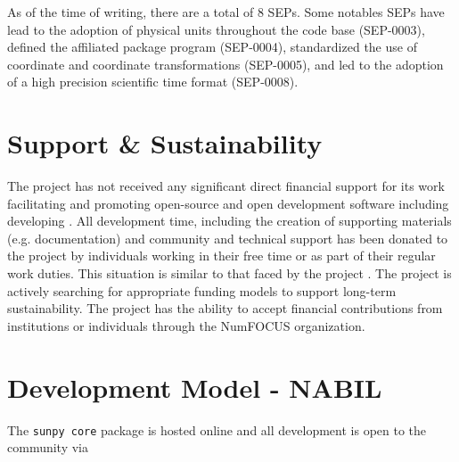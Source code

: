 As of the time of writing, there are a total of 8 SEPs. Some notables SEPs have lead to the adoption of physical units throughout the code base (SEP-0003), defined the affiliated package program (SEP-0004), standardized the use of coordinate and coordinate transformations (SEP-0005), and led to the adoption of a high precision scientific time format (SEP-0008).

\section{Support \& Sustainability}
The \sunpy project has not received any significant direct financial support for its work facilitating and promoting open-source and open development software including developing \sunpypkg. All development time, including the creation of supporting materials (e.g. documentation) and community and technical support has been donated to the project by individuals working in their free time or as part of their regular work duties. This situation is similar to that faced by the \astropy project \citep{PriceWhelan:2018ji}. The \sunpy project is actively searching for appropriate funding models to support long-term sustainability. The \sunpy project has the ability to accept financial contributions from institutions or individuals through the NumFOCUS organization.

\section{Development Model - NABIL}
The 
\verb|sunpy core| package is hosted online and all development is open to the community via 

